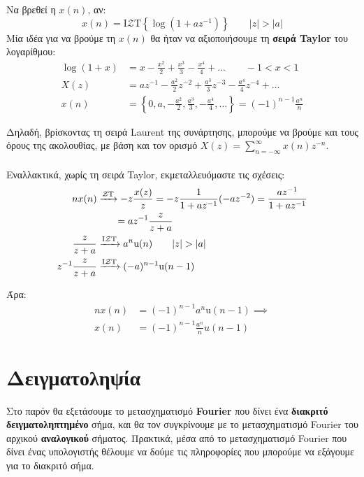 \documentclass[11pt,a4paper,notitlepage,fleqn,draft]{article}
\begin{document}
\begin{exercise}
	Να βρεθεί η \( x(n) \), αν:
	\[
	x(n) = \text{I}\mathcal{Z}\text{T} \left\lbrace 
	\log \left(1+az^{-1}\right)
	 \right\rbrace \qquad |z|>|a|
	\]
	\tcblower
	Μία ιδέα για να βρούμε τη \( x(n) \) θα ήταν να αξιοποιήσουμε τη \textbf{σειρά Taylor} του λογαρίθμου:
	\begin{align*}
		\log(1+x) &= x-\frac{x^2}{2} + \frac{x^3}{3} - \frac{x^4}{4} + \dots \qquad -1<x<1\\
		X(z) &= az^{-1} - \frac{a^2}{2}z^{-2} + \frac{a^3}{3}z^{-3} - \frac{a^4}{4} z^{-4} + \dots \\
		x(n) &= \left\lbrace 
		0, a , -\frac{a^2}{2}, \frac{a^3}{3},-\frac{a^4}{4},\dots
		 \right\rbrace = (-1)^{n-1}\frac{a^n}{n}
	\end{align*}
	
	Δηλαδή, βρίσκοντας τη σειρά Laurent της συνάρτησης, μπορούμε να βρούμε και τους όρους της ακολουθίας,
	με βάση και τον ορισμό \( X(z) = \sum_{n=-\infty}^{\infty} x(n)z^{-n}. \)
	
	\paragraph{}
	Εναλλακτικά, χωρίς τη σειρά Taylor, εκμεταλλευόμαστε τις σχέσεις:
	\begin{align*}
		nx(n) &\xrightarrow{\mathcal{Z}\text{T}} -z\od{x(z)}{z}
		= -z\frac{1}{1+az^{-1}}(-az^{-2})=\frac{az^{-1}}{1+az^{-1}}
		\\ &\hphantom{\xrightarrow{\mathcal{Z}\text{T}}} = az^{-1} \frac{z}{z+a}
        \\
        \frac{z}{z+a} &\xrightarrow{\text{I}\mathcal{Z}\text{T}} a^n \mathrm{u}(n) \qquad |z|>|a|\\
        z^{-1}\frac{z}{z+a} &\xrightarrow{\text{I}\mathcal{Z}\text{T}}
        (-a)^{n-1}\mathrm{u}(n-1)
	\end{align*}
	
	Άρα: \begin{align*}
	nx(n) &= (-1)^{n-1}a^n\mathrm{u}(n-1)
	\implies \\ x(n) &= (-1)^{n-1}\frac{a^n}{n} u(n-1)
	\end{align*}
\end{exercise}


\section{Δειγματοληψία}
Στο παρόν θα εξετάσουμε το μετασχηματισμό \textbf{Fourier} που δίνει ένα
\textbf{διακριτό δειγματοληπτημένο} σήμα, και θα τον συγκρίνουμε με το
μετασχηματισμό Fourier του αρχικού \textbf{αναλογικού} σήματος.
Πρακτικά, μέσα από το μετασχηματισμό Fourier που δίνει ένας υπολογιστής
θέλουμε να δούμε τις πληροφορίες που μπορούμε να εξάγουμε για το διακριτό
σήμα.
\end{document}
